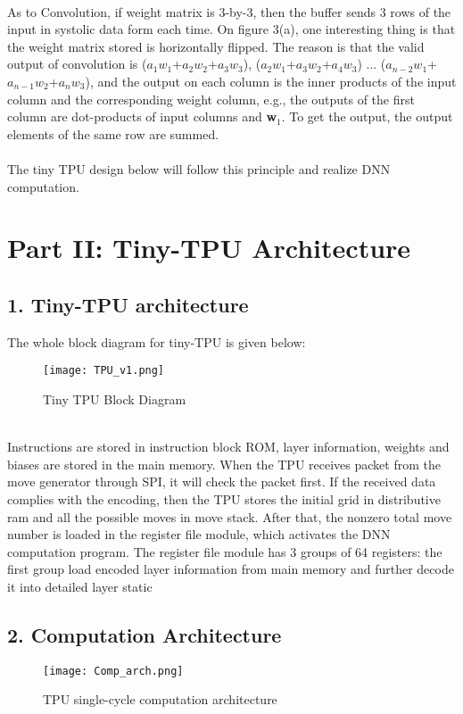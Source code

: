 \documentclass[12pt]{article}
\begin{document}
\\ 
As to Convolution, if weight matrix is 3-by-3, then the buffer sends 3 rows of the input in systolic data form each time. On figure 3(a), one interesting thing is that the weight matrix stored is horizontally flipped. The reason is that the valid output of convolution is ($a_1$$w_1$+$a_2$$w_2$+$a_3$$w_3$), ($a_2$$w_1$+$a_3$$w_2$+$a_4$$w_3$) ... ($a_{n-2}$$w_1$+$a_{n-1}$$w_2$+$a_n$$w_3$), and the output on each column is the inner products of the input column and the corresponding weight column, e.g., the outputs of the first column are dot-products of input columns and \textbf{w$_1$}. To get the output, the output elements of the same row are summed. \\
\\
The tiny TPU design below will follow this principle and realize DNN computation.

\section*{Part II: Tiny-TPU Architecture}
\subsection*{1. Tiny-TPU architecture}
The whole block diagram for tiny-TPU is given below:\\
\begin{figure}[h]
\begin{center}
\texttt{[image: TPU\_v1.png]}
\caption{Tiny TPU Block Diagram}
\label{fig:image2}
\end{center}
\end{figure}
\\
Instructions are stored in instruction block ROM, layer information, weights and biases are stored in the main memory. When the TPU receives packet from the move generator through SPI, it will check the packet first. If the received data complies with the encoding, then the TPU stores the initial grid in distributive ram and all the possible moves in move stack. After that, the nonzero total move number is loaded in the register file module, which activates the DNN computation program. The register file module has 3 groups of 64 registers: the first group load encoded layer information from main memory and further decode it into detailed layer static

\subsection*{2. Computation Architecture}
\begin{figure}[h]
\begin{center}
\texttt{[image: Comp\_arch.png]}
\caption{TPU single-cycle computation architecture}
\label{fig:image2}
\end{center}
\end{figure}
\end{document}
